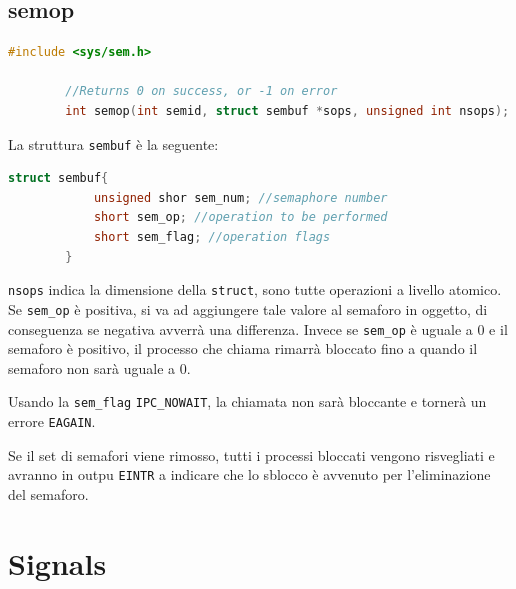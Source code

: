 \documentclass[a4paper, 12pt]{book}
\begin{document}
    \subsection{semop}

    \begin{lstlisting}[language=C]
        #include <sys/sem.h>

        //Returns 0 on success, or -1 on error 
        int semop(int semid, struct sembuf *sops, unsigned int nsops);
    \end{lstlisting}
    La struttura \verb|sembuf| è la seguente:
    \begin{lstlisting}[language=C]
        struct sembuf{
            unsigned shor sem_num; //semaphore number 
            short sem_op; //operation to be performed 
            short sem_flag; //operation flags
        }
    \end{lstlisting}
    \verb|nsops| indica la dimensione della \verb|struct|,
    sono tutte operazioni a livello atomico. Se \verb|sem_op| 
    è positiva, si va ad aggiungere tale valore al semaforo 
    in oggetto, di conseguenza se negativa avverrà una 
    differenza. Invece se \verb|sem_op| è uguale a 0 e il
    semaforo è positivo, il processo che chiama rimarrà
    bloccato fino a quando il semaforo non sarà uguale a 0.
    
    Usando la \verb|sem_flag| \verb|IPC_NOWAIT|, la chiamata 
    non sarà bloccante e tornerà un errore \verb|EAGAIN|.

    Se il set di semafori viene rimosso, tutti i processi 
    bloccati vengono risvegliati e avranno in outpu \verb|EINTR|
    a indicare che lo sblocco è avvenuto per l'eliminazione 
    del semaforo.

    \section{Signals}
\end{document}
